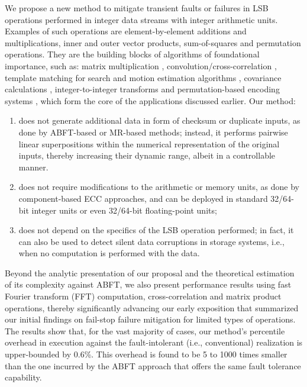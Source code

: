 \documentclass[twocolumn,english,onecolumn]{IEEEtran}
\theoremstyle{plain}
\theoremstyle{plain}
\begin{document}
We propose a new method to mitigate transient faults or failures in
LSB operations performed in integer data streams with integer arithmetic
units. Examples of such operations are element-by-element additions
and multiplications, inner and outer vector products, sum-of-squares
and permutation operations. They are the building blocks of algorithms
of foundational importance, such as: matrix multiplication \cite{goto2008anatomy,huang1984algorithm},
convolution/cross-correlation \cite{anam2012throughput}, template
matching for search and motion estimation algorithms \cite{kadyrov2006invaders,anastasia2010software,anastasia2012throughput,barbarien2004scalable,foo2008analytical,kontorinis2009statistical,andreopoulos2007adaptive},
covariance calculations \cite{golub1996matrix,yang2004two}, integer-to-integer
transforms \cite{lin2000packed,andreopoulos2002new,andreopoulos2001local,andreopoulos2003high}
and permutation-based encoding systems \cite{fenwick1996burrows},
which form the core of the applications discussed earlier. Our method:
\begin{enumerate}
\item does not generate additional data in form of checksum or duplicate
inputs, as done by ABFT-based or MR-based methods; instead, it performs
pairwise linear superpositions within the numerical representation
of the original inputs, thereby increasing their dynamic range, albeit
in a controllable manner. 
\item does not require modifications to the arithmetic or memory units,
as done by component-based ECC approaches, and can be deployed in
standard 32/64-bit integer units or even 32/64-bit floating-point
units; 
\item does not depend on the specifics of the LSB operation performed; in
fact, it can also be used to detect silent data corruptions in storage
systems, i.e., when no computation is performed with the data. 
\end{enumerate}
Beyond the analytic presentation of our proposal and the theoretical
estimation of its complexity against ABFT, we also present performance
results using fast Fourier transform (FFT) computation, cross-correlation
and matrix product operations, thereby significantly advancing our
early exposition \cite{AnamIOLTS15} that summarized our initial findings
on fail-stop failure mitigation for limited types of operations. The
results show that, for the vast majority of cases, our method's percentile
overhead in execution against the fault-intolerant (i.e., conventional)
realization is upper-bounded by 0.6\%. This overhead is found to be
5 to 1000 times smaller than the one incurred by the ABFT approach
that offers the same fault tolerance capability. 
\end{document}
